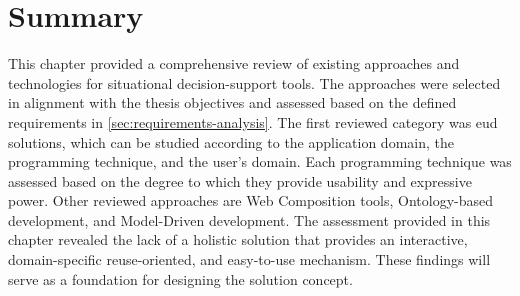 \vspace{-15pt}
\hypertarget{sec:sota.summary}{%
\section{Summary}\label{sec:sota.summary}}
\vspace{15pt}

This chapter provided a comprehensive review of existing approaches and technologies for situational decision-support tools. The approaches were selected in alignment with the thesis objectives and assessed based on the defined requirements in \cref{sec:requirements-analysis}. The first reviewed category was \gls{eud} solutions, which can be studied according to the application domain, the programming technique, and the user’s domain. Each programming technique was assessed based on the degree to which they provide usability and expressive power. Other reviewed approaches are Web Composition tools, Ontology-based development, and Model-Driven development. The assessment provided in this chapter revealed the lack of a holistic solution that provides an interactive, domain-specific reuse-oriented, and easy-to-use mechanism. These findings will serve as a foundation for designing the solution concept.
